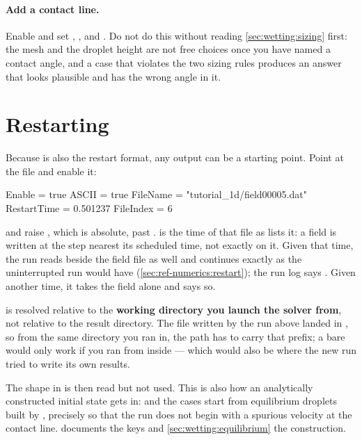 \paragraph{Add a contact line.} Enable  and set
, ,  and
. Do not do this without reading
\cref{sec:wetting:sizing} first: the mesh and the droplet height are not free
choices once you have named a contact angle, and a case that violates the two
sizing rules produces an answer that looks plausible and has the wrong angle in
it.

\section{Restarting}
\label{sec:firstrun:restart}

Because  is also the restart format, any output can be a
starting point. Point  at the file and enable it:

\begin{toml}
[Restart]
Enable      = true
ASCII       = true
FileName    = "tutorial_1d/field00005.dat"
RestartTime = 0.501237
FileIndex   = 6
\end{toml}

and raise , which is absolute, past .
 is the time of that file as  lists
it: a field is written at the step nearest its scheduled time, not exactly on
it. Given that time, the run reads  beside the field
file as well and continues exactly as the uninterrupted run would have
(\cref{sec:ref-numerics:restart}); the run log says
. Given another
time, it takes the field alone and says so.

 is resolved relative to the \textbf{working directory you launch
the solver from}, not relative to the result directory. The file written by the
run above landed in , so from the same directory you ran in,
the path has to carry that prefix; a bare  would only work
if you ran from inside  --- which would also be where the
new run tried to write its own results.

The shape in  is then read but not used. This is also
how an analytically constructed initial state gets in:  and
the  cases start from equilibrium droplets built by
, precisely so that the run does not begin
with a spurious velocity at the contact line.  documents
the keys and \cref{sec:wetting:equilibrium} the construction.

